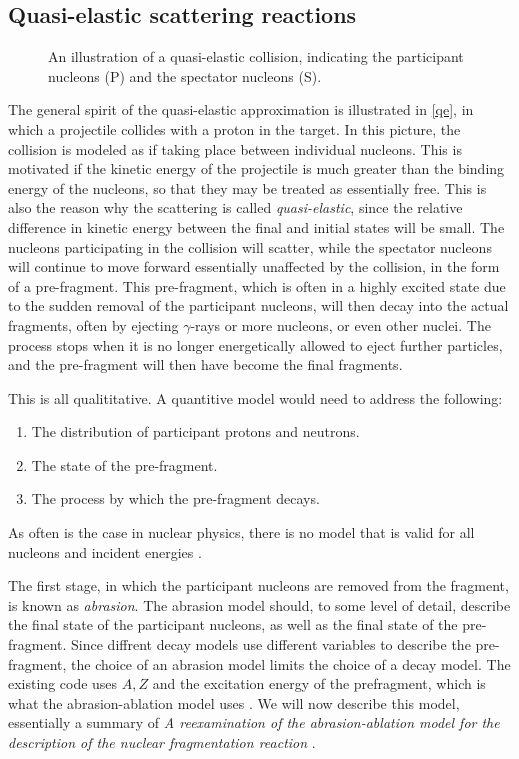 \documentclass[12pt, a4paper]{article}
\begin{document}
\clearpage
\subsection{Quasi-elastic scattering reactions}
\label{tqe} 
\begin{figure}
\centering

\caption{\label{qe} An illustration of a quasi-elastic collision, indicating the participant nucleons (P) and the spectator nucleons (S).}
\end{figure}
The general spirit of the quasi-elastic approximation is illustrated in \autoref{qe}, in which a projectile collides with a proton in the target. In this picture, the collision is modeled as if taking place between individual nucleons. This is motivated if the kinetic energy of the projectile is much greater than the binding energy of the nucleons, so that they may be treated as essentially free. This is also the reason why the scattering is called \emph{quasi-elastic}, since the relative difference in kinetic energy between the final and initial states will be small.
The nucleons participating in the collision will scatter, while the spectator nucleons will continue to move forward essentially unaffected by the collision, in the form of a pre-fragment. This pre-fragment, which is often in a highly excited state due to the sudden removal of the participant nucleons, will then decay into the actual fragments, often by ejecting $\gamma$-rays or more nucleons, or even other nuclei. The process stops when it is no longer energetically allowed to eject further particles, and the pre-fragment will then have become the final fragments.

This is all qualititative. A quantitive model would need to address the following:
\begin{enumerate}
\item The distribution of participant protons and neutrons.
\item The state of the pre-fragment.
\item The process by which the pre-fragment decays.
\end{enumerate}
As often is the case in nuclear physics, there is no model that is valid for all nucleons and incident energies \cite{nasa}. 

The first stage, in which the participant nucleons are removed from the fragment, is known as \emph{abrasion}. The abrasion model should, to some level of detail, describe the final state of the participant nucleons, as well as the final state of the pre-fragment. Since diffrent decay models use different variables to describe the pre-fragment, the choice of an abrasion model limits the choice of a decay model. The existing code uses $A,Z$ and the excitation energy of the prefragment, which is what the abrasion-ablation model uses \cite{aa}. We will now describe this model, essentially a summary of \emph{A reexamination of the abrasion-ablation model for the description of the nuclear fragmentation reaction} \cite{aa}.
\end{document}
